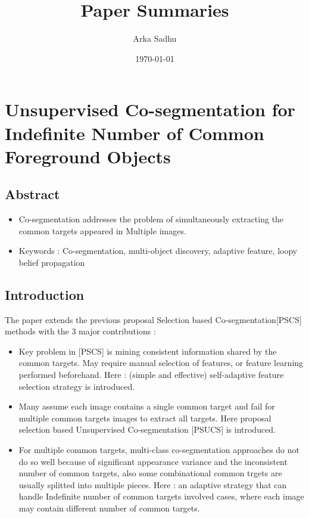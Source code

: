 \documentclass{article}
\title{Paper Summaries}
\author{
  Arka Sadhu}
\date{\today}
\begin{document}
\maketitle

\tableofcontents
\newpage

\section{Unsupervised Co-segmentation for Indefinite Number of Common Foreground Objects}
\cite{7401081}
\subsection{Abstract}
\begin{itemize}
\item Co-segmentation addresses the problem of simultaneously extracting the common targets appeared in Multiple images.
\item Keywords : Co-segmentation, multi-object discovery, adaptive feature, loopy belief propagation
\end{itemize}

\subsection{Introduction}
The paper extends the previous proposal Selection based Co-segmentation[PSCS] methods with the 3 major contributions :
\begin{itemize}
\item Key problem in [PSCS] is mining consistent information shared by the common targets. May require manual selection of features, or feature learning performed beforehand. Here : (simple and effective) self-adaptive feature selection strategy is introduced.
\item Many assume each image contains a single common target and fail for multiple common targets images to extract all targets. Here proposal selection based Unsupervised Co-segmentation [PSUCS] is introduced.
\item For multiple common targets, multi-class co-segmentation approaches do not do so well because of significant appearance variance and the inconsistent number of common targets, also some combinational common trgets are usually splitted into multiple pieces. Here : an adaptive strategy that can handle Indefinite number of common targets involved cases, where each image may contain different number of common targets.
\end{itemize}
\end{document}
